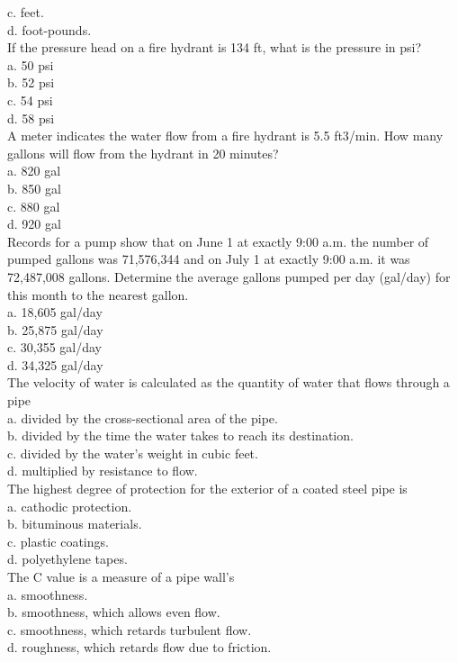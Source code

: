 c.	feet.\\
d.	foot-pounds.\\
If the pressure head on a fire hydrant is 134 ft, what is the pressure in psi?\\
a.	50 psi\\
b.	52 psi\\
c.	54 psi\\
d.	58 psi\\
A meter indicates the water flow from a fire hydrant is 5.5 ft3/min. How many gallons will flow from the hydrant in 20 minutes?\\
a.	820 gal\\
b.	850 gal\\
c.	880 gal\\
d.	920 gal\\
Records for a pump show that on June 1 at exactly 9:00 a.m. the number of pumped gallons was 71,576,344 and on July 1 at exactly 9:00 a.m. it was 72,487,008 gallons. Determine the average gallons pumped per day (gal/day) for this month to the nearest gallon.\\
a.	18,605 gal/day\\
b.	25,875 gal/day\\
c.	30,355 gal/day\\
d.	34,325 gal/day\\
The velocity of water is calculated as the quantity of water that flows through a pipe\\
a.	divided by the cross-sectional area of the pipe.\\
b.	divided by the time the water takes to reach its destination.\\
c.	divided by the water's weight in cubic feet.\\
d.	multiplied by resistance to flow.\\
The highest degree of protection for the exterior of a coated steel pipe is\\
a.	cathodic protection.\\
b.	bituminous materials.\\
c.	plastic coatings.\\
d.	polyethylene tapes.\\
The C value is a measure of a pipe wall's\\
a.	smoothness.\\
b.	smoothness, which allows even flow.\\
c.	smoothness, which retards turbulent flow.\\
d.	roughness, which retards flow due to friction.\\
